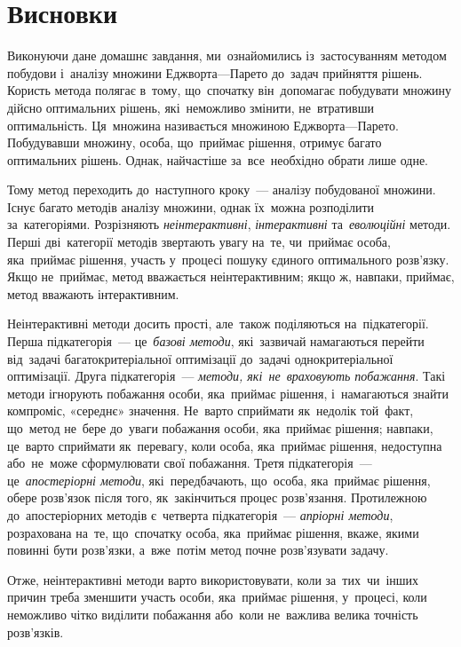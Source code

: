 \documentclass[
  a4paper,
  oneside,
  BCOR = 10mm,
  DIV = 12,
  12pt,
  headings = normal,
]{scrartcl}
\begin{document}
  \clearpage
  \section{Висновки}
    Виконуючи дане домашнє завдання, ми~ознайомились із~застосуванням методом побудови і~аналізу множини Еджворта—Парето до~задач прийняття рішень. Користь метода полягає в~тому, що~спочатку він~допомагає побудувати множину дійсно оптимальних рішень, які~неможливо змінити, не~втративши оптимальність. Ця~множина називається множиною Еджворта—Парето. Побудувавши множину, особа, що~приймає рішення, отримує багато оптимальних рішень. Однак, найчастіше за~все~необхідно обрати лише одне.

    Тому метод переходить до~наступного кроку~— аналізу побудованої множини. Існує багато методів аналізу множини, однак їх~можна розподілити за~категоріями. Розрізняють \emph{неінтерактивні}, \emph{інтерактивні} та~\emph{еволюційні} методи. Перші дві~категорії методів звертають увагу на~те, чи~приймає особа, яка~приймає рішення, участь у~процесі пошуку єдиного оптимального розв'язку. Якщо не~приймає, метод вважається неінтерактивним; якщо ж, навпаки, приймає, метод вважають інтерактивним.

    Неінтерактивні методи досить прості, але~також поділяються на~підкатегорії. Перша підкатегорія~— це~\emph{базові методи}, які~зазвичай намагаються перейти від~задачі багатокритеріальної оптимізації до~задачі однокритеріальної оптимізації. Друга підкатегорія~— \emph{методи, які~не~враховують побажання}. Такі методи ігнорують побажання особи, яка~приймає рішення, і~намагаються знайти компроміс, «середнє» значення. Не~варто сприймати як~недолік той~факт, що~метод не~бере до~уваги побажання особи, яка~приймає рішення; навпаки, це~варто сприймати як~перевагу, коли особа, яка~приймає рішення, недоступна або~не~може сформулювати свої побажання. Третя підкатегорія~— це~\emph{апостеріорні методи}, які~передбачають, що~особа, яка~приймає рішення, обере розв'язок після того, як~закінчиться процес розв'язання. Протилежною до~апостеріорних методів є~четверта підкатегорія~— \emph{апріорні методи}, розрахована на~те, що~спочатку особа, яка~приймає рішення, вкаже, якими повинні бути розв'язки, а~вже~потім метод почне розв'язувати задачу.

    Отже, неінтерактивні методи варто використовувати, коли за~тих~чи~інших причин треба зменшити участь особи, яка~приймає рішення, у~процесі, коли неможливо чітко виділити побажання або~коли не~важлива велика точність розв'язків.
\end{document}
